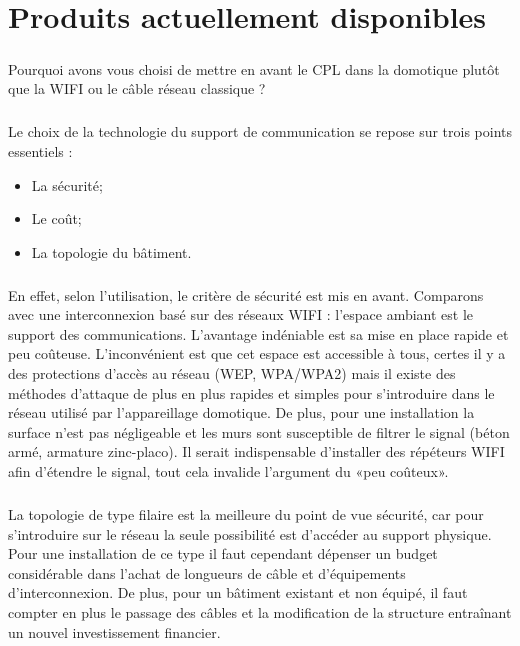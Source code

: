 \chapter{Produits actuellement disponibles}
    \paragraph{}
Pourquoi avons vous choisi de mettre en avant le CPL dans la domotique plutôt que la WIFI ou le câble réseau classique ?
    \paragraph{}
Le choix de la technologie du support de communication se repose sur trois points essentiels :
        \begin{itemize}
            \item La sécurité;
            \item Le coût;
            \item La topologie du bâtiment.
        \end{itemize}
    \paragraph{}
En effet, selon l’utilisation, le critère de sécurité est mis en avant.
Comparons avec une interconnexion basé sur des réseaux WIFI : l’espace ambiant est le support des communications.
L’avantage indéniable est sa mise en place rapide et peu coûteuse.
L’inconvénient est que cet espace est accessible à tous, certes il y a des protections d'accès au réseau (WEP, WPA/WPA2)
mais il existe des méthodes d’attaque de plus en plus rapides et simples pour s’introduire dans le réseau utilisé par l’appareillage domotique.
De plus, pour une installation la surface n'est pas négligeable et les murs sont susceptible de filtrer le signal (béton armé, armature zinc-placo).
Il serait indispensable d’installer des répéteurs WIFI afin d’étendre le signal, tout cela invalide l’argument du «peu coûteux».
    \paragraph{}
La topologie de type filaire est la meilleure du point de vue sécurité, car pour s'introduire sur le réseau la seule possibilité est d’accéder au support physique.
Pour une installation de ce type il faut cependant dépenser un budget considérable dans l’achat de longueurs de câble et d'équipements d’interconnexion.
De plus, pour un bâtiment existant et non équipé, il faut compter en plus le passage des câbles et la modification de la structure entraînant un nouvel investissement financier.
